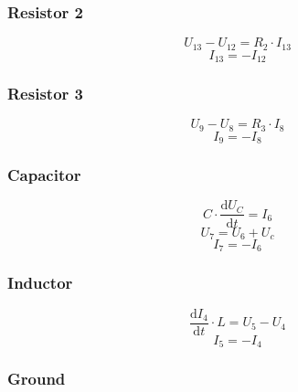\documentclass[10pt,a4paper]{article}
\begin{document}
\subsubsection*{Resistor 2}

\begin{equation*}
  U_{13} - U_{12} = R_{2} \cdot I_{13}
\end{equation*}
\begin{equation*}
  I_{13} = -I_{12}
\end{equation*}

\subsubsection*{Resistor 3}

\begin{equation*}
  U_{9} - U_{8} = R_{3} \cdot I_{8}
\end{equation*}
\begin{equation*}
  I_{9} = -I_{8}
\end{equation*}

\subsubsection*{Capacitor}

\begin{equation*}
  C \cdot \frac{\text{d}U_{C}}{\text{d}t} = I_{6}
\end{equation*}
\begin{equation*}
  U_{7} = U_{6} + U_{c}
\end{equation*}
\begin{equation*}
  I_{7} = -I_{6}
\end{equation*}

\subsubsection*{Inductor}

\begin{equation*}
  \frac{\text{d}I_{4}}{\text{d}t} \cdot L = U_{5} - U_{4}
\end{equation*}
\begin{equation*}
  I_{5} = -I_{4}
\end{equation*}

\subsubsection*{Ground}
\end{document}
